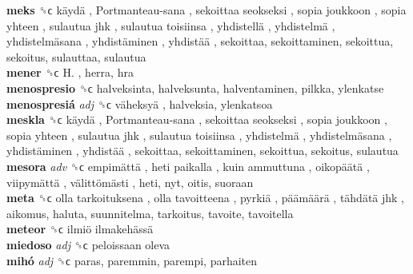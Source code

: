 \textbf{meks} ␝ϲ   käydä ,  Portmanteau-sana ,  sekoittaa seokseksi ,  sopia joukkoon ,  sopia yhteen ,  sulautua jhk ,  sulautua toisiinsa ,  yhdistellä ,  yhdistelmä ,  yhdistelmäsana ,  yhdistäminen ,  yhdistää , sekoittaa, sekoittaminen, sekoittua, sekoitus, sulauttaa, sulautua  \\
\textbf{mener} ␝ϲ   H. , herra, hra  \\
\textbf{menospresio} ␝ϲ  halveksinta, halveksunta, halventaminen, pilkka, ylenkatse  \\
\textbf{menospresiá} \emph{adj}  ␝ϲ   väheksyä , halveksia, ylenkatsoa  \\
\textbf{meskla} ␝ϲ   käydä ,  Portmanteau-sana ,  sekoittaa seokseksi ,  sopia joukkoon ,  sopia yhteen ,  sulautua jhk ,  sulautua toisiinsa ,  yhdistelmä ,  yhdistelmäsana ,  yhdistäminen ,  yhdistää , sekoittaa, sekoittaminen, sekoittua, sekoitus, sulautua  \\
\textbf{mesora} \emph{adv}  ␝ϲ   empimättä ,  heti paikalla ,  kuin ammuttuna ,  oikopäätä ,  viipymättä ,  välittömästi , heti, nyt, oitis, suoraan  \\
\textbf{meta} ␝ϲ   olla tarkoituksena ,  olla tavoitteena ,  pyrkiä ,  päämäärä ,  tähdätä jhk , aikomus, haluta, suunnitelma, tarkoitus, tavoite, tavoitella  \\
\textbf{meteor} ␝ϲ   ilmiö ilmakehässä   \\
\textbf{miedoso} \emph{adj}  ␝ϲ   peloissaan oleva   \\
\textbf{mihó} \emph{adj}  ␝ϲ  paras, paremmin, parempi, parhaiten  \\
